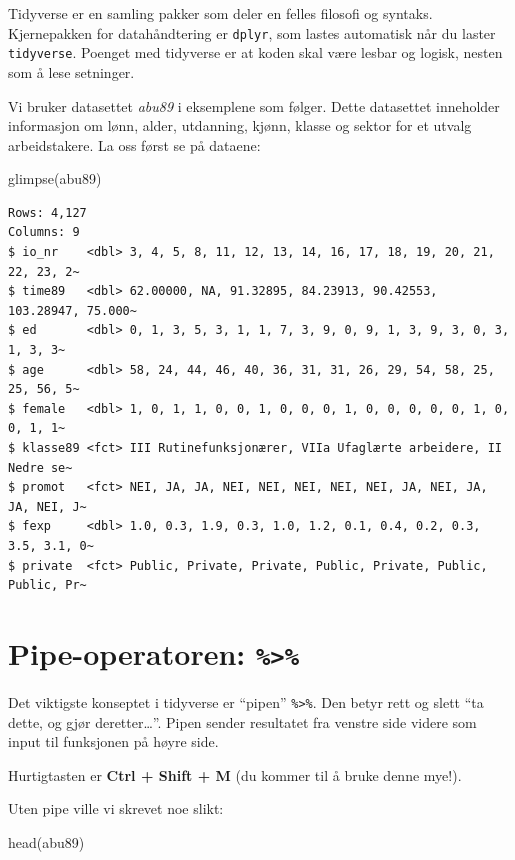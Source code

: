 \documentclass[
  norsk,
  letterpaper,
  DIV=11,
  numbers=noendperiod]{scrreprt}
\newenvironment{Shaded}{\begin{snugshade}}{\end{snugshade}}
\newcommand{\FunctionTok}[1]{\textcolor[rgb]{0.28,0.35,0.67}{#1}}
\newcommand{\NormalTok}[1]{\textcolor[rgb]{0.00,0.23,0.31}{#1}}
\theoremstyle{definition}
\theoremstyle{remark}
\begin{document}
Tidyverse er en samling pakker som deler en felles filosofi og syntaks.
Kjernepakken for datahåndtering er \texttt{dplyr}, som lastes automatisk
når du laster \texttt{tidyverse}. Poenget med tidyverse er at koden skal
være lesbar og logisk, nesten som å lese setninger.

Vi bruker datasettet \emph{abu89} i eksemplene som følger. Dette
datasettet inneholder informasjon om lønn, alder, utdanning, kjønn,
klasse og sektor for et utvalg arbeidstakere. La oss først se på
dataene:

\begin{Shaded}
\begin{Highlighting}[]
\FunctionTok{glimpse}\NormalTok{(abu89)}
\end{Highlighting}
\end{Shaded}

\begin{verbatim}
Rows: 4,127
Columns: 9
$ io_nr    <dbl> 3, 4, 5, 8, 11, 12, 13, 14, 16, 17, 18, 19, 20, 21, 22, 23, 2~
$ time89   <dbl> 62.00000, NA, 91.32895, 84.23913, 90.42553, 103.28947, 75.000~
$ ed       <dbl> 0, 1, 3, 5, 3, 1, 1, 7, 3, 9, 0, 9, 1, 3, 9, 3, 0, 3, 1, 3, 3~
$ age      <dbl> 58, 24, 44, 46, 40, 36, 31, 31, 26, 29, 54, 58, 25, 25, 56, 5~
$ female   <dbl> 1, 0, 1, 1, 0, 0, 1, 0, 0, 0, 1, 0, 0, 0, 0, 0, 1, 0, 0, 1, 1~
$ klasse89 <fct> III Rutinefunksjonærer, VIIa Ufaglærte arbeidere, II Nedre se~
$ promot   <fct> NEI, JA, JA, NEI, NEI, NEI, NEI, NEI, JA, NEI, JA, JA, NEI, J~
$ fexp     <dbl> 1.0, 0.3, 1.9, 0.3, 1.0, 1.2, 0.1, 0.4, 0.2, 0.3, 3.5, 3.1, 0~
$ private  <fct> Public, Private, Private, Public, Private, Public, Public, Pr~
\end{verbatim}

\section{\texorpdfstring{Pipe-operatoren:
\texttt{\%\textgreater{}\%}}{Pipe-operatoren: \%\textgreater\%}}\label{pipe-operatoren}

Det viktigste konseptet i tidyverse er ``pipen''
\texttt{\%\textgreater{}\%}. Den betyr rett og slett ``ta dette, og gjør
deretter\ldots{}''. Pipen sender resultatet fra venstre side videre som
input til funksjonen på høyre side.

Hurtigtasten er \textbf{Ctrl + Shift + M} (du kommer til å bruke denne
mye!).

Uten pipe ville vi skrevet noe slikt:

\begin{Shaded}
\begin{Highlighting}[]
\FunctionTok{head}\NormalTok{(abu89)}
\end{Highlighting}
\end{Shaded}
\end{document}
